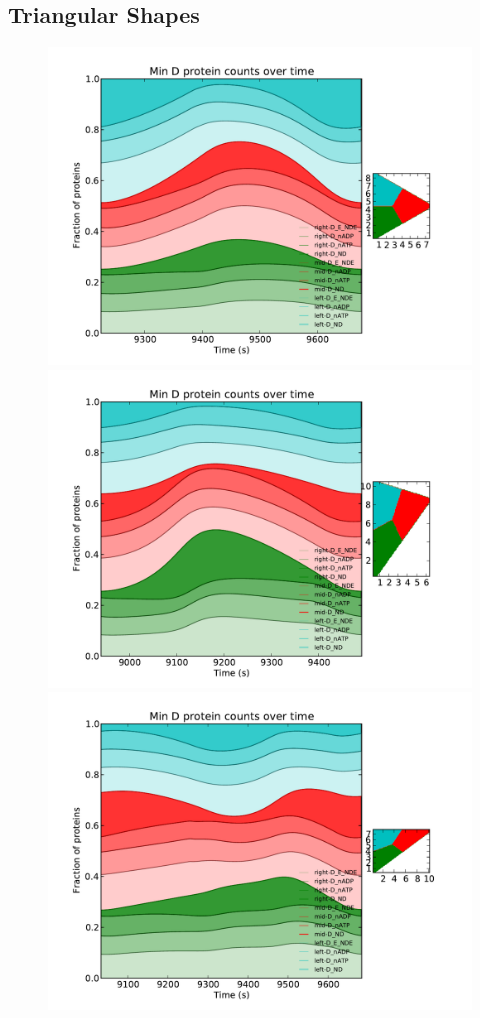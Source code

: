 \documentclass[letterpaper,twocolumn,amsmath,amssymb,pre]{revtex4-1}
\begin{document}
\subsection{Triangular Shapes}
\begin{figure}
  \includegraphics[width=\columnwidth]{../data/shape-triangle/plots/box-plot_D--triangle-25-400-400-400-1500}
  \includegraphics[width=\columnwidth]{../data/shape-triangle/plots/box-plot_D--triangle-25-500-500-300-1500}
  \includegraphics[width=\columnwidth]{../data/shape-triangle/plots/box-plot_D--triangle-25-360-480-600-1500}

\end{figure}
\end{document}
